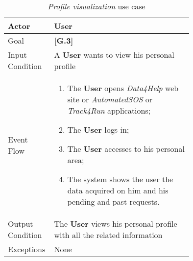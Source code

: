\begin{center}
\begin{table}
\begin{tabular}{ | l | p{0.75\linewidth} | }
  \hline
    Actor & \textbf{User} \\ \hline
    Goal & \textbf{[G.3]} \\ \hline
    Input Condition & A \textbf{User} wants to view his personal profile\\ \hline
    Event Flow & \begin{minipage}[t]{0.7\textwidth}
      \begin{enumerate}
        \item The \textbf{User} opens \textit{Data4Help} web site or \textit{AutomatedSOS} or \textit{Track4Run} applications;
        \item The \textbf{User} logs in;
        \item The \textbf{User} accesses to his personal area;
        \item The system shows the user the data acquired on him and his pending and past requests.
      \end{enumerate}
    \smallskip
  \end{minipage} \\ \hline
  Output Condition & The \textbf{User} views his personal profile with all the related information\\ \hline
  Exceptions & None \\ \hline
\end{tabular}
\caption{\textit{Profile visualization} use case}
\label{table:profileVisualizationTable}
\end{table}
\end{center}

